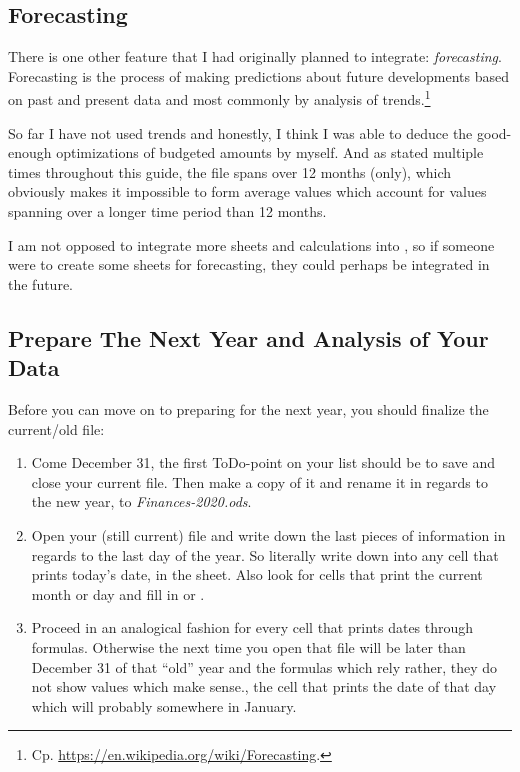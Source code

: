 \subsection{Forecasting}
\label{subsec:forecasting}

There is one other feature that I had originally planned to integrate: \emph{forecasting}.
Forecasting is the process of making predictions about future developments based on past and present data and most commonly by analysis of trends.\footnote{Cp. \href{https://en.wikipedia.org/wiki/Forecasting}{https://en.wikipedia.org/wiki/Forecasting}.}

So far I have not used trends and honestly, I think I was able to deduce the good-enough optimizations of budgeted amounts by myself.
And as stated multiple times throughout this guide, the file spans over 12 months (only), which obviously makes it impossible to form average values which account for values spanning over a longer time period than 12 months.

I am not opposed to integrate more sheets and calculations into \tfn, so if someone were to create some sheets for forecasting, they could perhaps be integrated in the future.

\subsection{Prepare The Next Year and Analysis of Your Data}
\label{subsec:prepare-the-next-year-analysis}

Before you can move on to preparing \tfn for the next year, you should finalize the current/old file:
\begin{enumerate}
	\item Come December 31, the first ToDo-point on your list should be to save and close your current file.
	Then make a copy of it and rename it in regards to the new year, \eg to \emph{Finances-2020.ods}.
	\item Open your (still current) file and write down the last pieces of information in regards to the last day of the year.
	So literally write down  into any cell that prints today's date, \eg in the  sheet.
	Also look for cells that print the current month or day and fill in  or .
	\item Proceed in an analogical fashion for every cell that prints dates through formulas.
	Otherwise the next time you open that file will be later than December 31 of that ``old'' year and the formulas which rely rather, they do not show values which make sense., the cell that prints the date of that day which will probably somewhere in January.
\end{enumerate}

